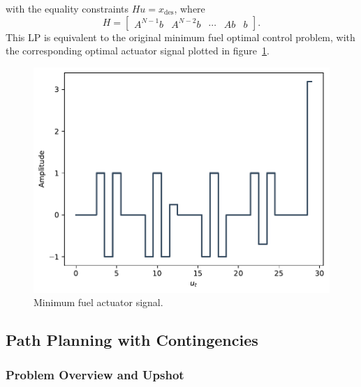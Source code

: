 \documentclass[12pt,reqno]{article}
\theoremstyle{definition}
\numberwithin{equation}{section}
\begin{document}
    with the equality constraints $Hu = x_{\mathrm{des}}$, where
    \[H = \begin{bmatrix}
        A^{N-1}b & A^{N-2}b & \cdots & Ab & b
    \end{bmatrix}.\]
    This LP is equivalent to the original minimum fuel optimal control problem, with the corresponding optimal actuator signal
    plotted in figure~\ref{fig:4-16_min-fuel}.
   

   \begin{figure}[htbp]
    \centering
    \includegraphics[width=\linewidth]{../examples/364a/cvx-ch4/4-16_min-fuel.pdf}
    \caption{Minimum fuel actuator signal.}
    \label{fig:4-16_min-fuel}
    \end{figure}

\subsection{Path Planning with Contingencies}

\subsubsection*{Problem Overview and Upshot}
\end{document}
